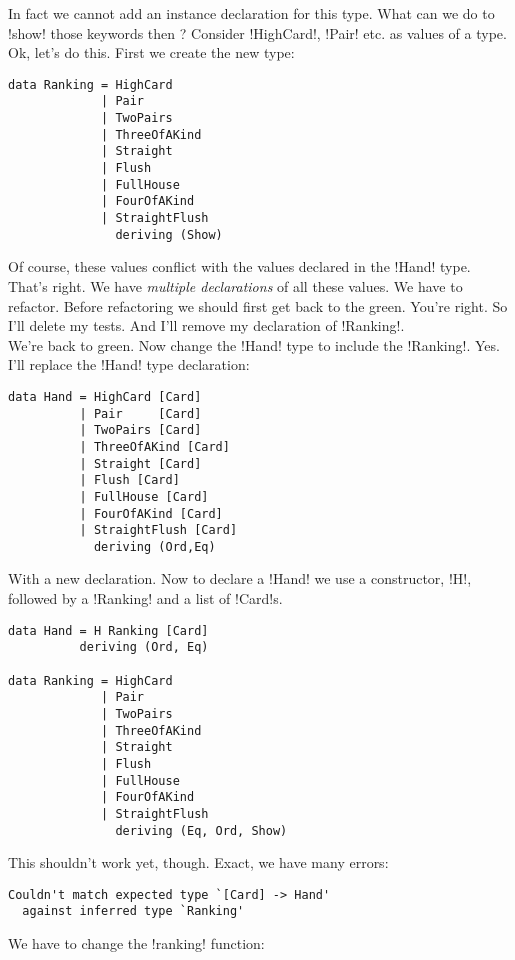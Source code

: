 In fact we cannot add an instance declaration for this type. 
\lhN What can we do to \il!show! those keywords then ?
\lhA Consider \il!HighCard!, \il!Pair! etc. as values of a type.
\lhN Ok, let's do this.
\lhA First we create the new type:
\begin{lstlisting}[frame=single]
data Ranking = HighCard 
             | Pair
             | TwoPairs
             | ThreeOfAKind
             | Straight
             | Flush
             | FullHouse
             | FourOfAKind
             | StraightFlush
               deriving (Show)
\end{lstlisting}
\error Of course, these values conflict with the values declared in the \il!Hand! type.
\lhN That's right. We have \emph{multiple declarations} of all these values. We have to refactor.
\lhA Before refactoring we should first get back to the green.
\lhN You're right. So I'll delete my tests.
\lhA And I'll remove my declaration of \il!Ranking!. \\ 
\success We're back to green.
\lhN Now change the \il!Hand! type to include the \il!Ranking!.
\lhA Yes. I'll replace the \il!Hand! type declaration:
\begin{lstlisting}[frame=single]
data Hand = HighCard [Card]
          | Pair     [Card]
          | TwoPairs [Card]
          | ThreeOfAKind [Card]
          | Straight [Card]
          | Flush [Card]
          | FullHouse [Card]
          | FourOfAKind [Card]
          | StraightFlush [Card]
            deriving (Ord,Eq)
\end{lstlisting}
With a new declaration. Now to declare a \il!Hand! we use a constructor, \il!H!, followed by a \il!Ranking! and a list of \il!Card!s.
\begin{lstlisting}[frame=single]
data Hand = H Ranking [Card]
          deriving (Ord, Eq)

data Ranking = HighCard
             | Pair
             | TwoPairs
             | ThreeOfAKind
             | Straight
             | Flush
             | FullHouse
             | FourOfAKind
             | StraightFlush
               deriving (Eq, Ord, Show)
\end{lstlisting}
\error This shouldn't work yet, though.
\lhN Exact, we have many errors:
\begin{small}
\begin{verbatim}
Couldn't match expected type `[Card] -> Hand'
  against inferred type `Ranking'
\end{verbatim}
\end{small}
\lhA \error We have to change the \il!ranking! function:
